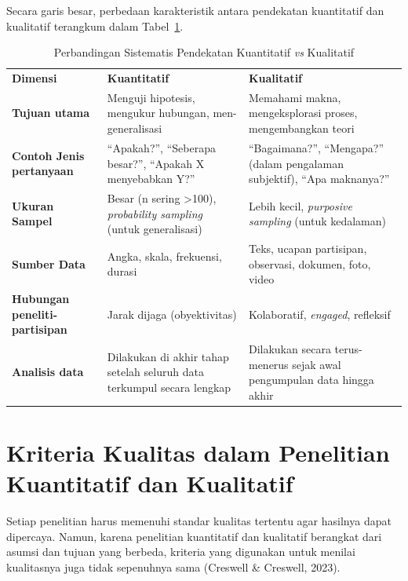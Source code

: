 \documentclass[
  indonesian,
  letterpaper,
  DIV=11,
  numbers=noendperiod]{scrreprt}
\begin{document}
Secara garis besar, perbedaan karakteristik antara pendekatan
kuantitatif dan kualitatif terangkum dalam Tabel~\ref{tbl-kuanvskual}.

\begin{longtable}[]{@{}
  >{\raggedright\arraybackslash}p{}
  >{\raggedright\arraybackslash}p{}
  >{\raggedright\arraybackslash}p{}@{}}
\caption{Perbandingan Sistematis Pendekatan Kuantitatif \emph{vs}
Kualitatif}\label{tbl-kuanvskual}\tabularnewline
\toprule\noalign{}
\endfirsthead
\endhead
\bottomrule\noalign{}
\endlastfoot
\textbf{Dimensi} & \textbf{Kuantitatif} & \textbf{Kualitatif} \\
\textbf{Tujuan utama} & Menguji hipotesis, mengukur hubungan,
men-generalisasi & Memahami makna, mengeksplorasi proses, mengembangkan
teori \\
\textbf{Contoh Jenis pertanyaan} & ``Apakah?'', ``Seberapa besar?'',
``Apakah X menyebabkan Y?'' & ``Bagaimana?'', ``Mengapa?'' (dalam
pengalaman subjektif), ``Apa maknanya?'' \\
\textbf{Ukuran Sampel} & Besar (n sering \textgreater100),
\emph{probability sampling} (untuk generalisasi) & Lebih kecil,
\emph{purposive sampling} (untuk kedalaman) \\
\textbf{Sumber Data} & Angka, skala, frekuensi, durasi & Teks, ucapan
partisipan, observasi, dokumen, foto, video \\
\textbf{Hubungan peneliti-partisipan} & Jarak dijaga (obyektivitas) &
Kolaboratif, \emph{engaged}, refleksif \\
\textbf{Analisis data} & Dilakukan di akhir tahap setelah seluruh data
terkumpul secara lengkap & Dilakukan secara terus-menerus sejak awal
pengumpulan data hingga akhir \\
\end{longtable}

\section{Kriteria Kualitas dalam Penelitian Kuantitatif dan
Kualitatif}\label{kriteria-kualitas-dalam-penelitian-kuantitatif-dan-kualitatif}

Setiap penelitian harus memenuhi standar kualitas tertentu agar hasilnya
dapat dipercaya. Namun, karena penelitian kuantitatif dan kualitatif
berangkat dari asumsi dan tujuan yang berbeda, kriteria yang digunakan
untuk menilai kualitasnya juga tidak sepenuhnya sama (Creswell \&
Creswell, 2023).
\end{document}
